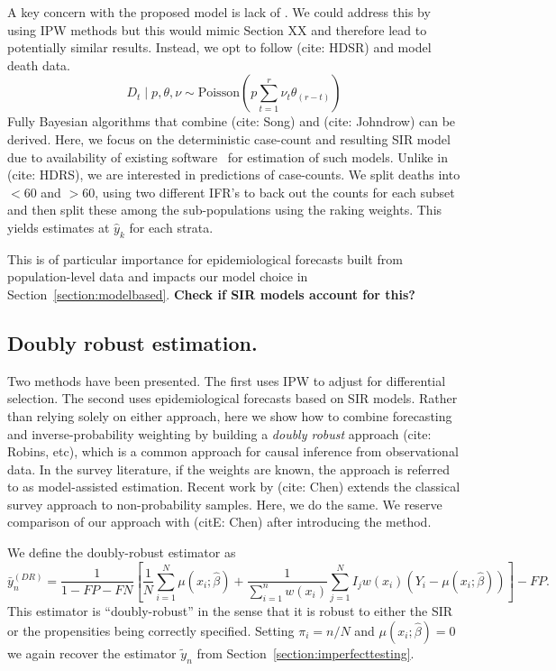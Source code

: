 \documentclass[11pt]{amsart}
\begin{document}
A key concern with the proposed model is lack of . We could address this by using IPW methods but this would mimic Section XX and therefore lead to potentially similar results.  Instead, we opt to follow (cite: HDSR) and model death data.
$$
D_t \mid p, \theta, \nu \sim \text{Poisson} \left( p \sum_{t=1}^r \nu_t \theta_{(r-t)} \right)
$$
Fully Bayesian algorithms that combine (cite: Song) and (cite: Johndrow) can be derived.  Here, we focus on the deterministic case-count and resulting SIR model due to availability of existing software~\cite{Song2020} for estimation of such models. Unlike in (cite: HDRS), we are interested in predictions of case-counts.  We split deaths into $<60$ and $>60$, using two different IFR's to back out the counts for each subset and then split these among the sub-populations using the raking weights.  This yields estimates at $\hat y_k$ for each strata.

This is of particular importance for epidemiological forecasts built from population-level data and impacts our model choice in Section~\ref{section:modelbased}.
{\bf Check if SIR models account for this?}

\subsection{Doubly robust estimation.}
Two methods have been presented.  The first uses IPW to adjust for differential selection.  The second uses epidemiological forecasts based on SIR models.  Rather than relying solely on either approach, here we show how to combine forecasting and inverse-probability weighting by building a \emph{doubly robust} approach (cite: Robins, etc), which is a common approach for causal inference from observational data.  In the survey literature, if the weights are known, the approach is referred to as model-assisted estimation.  Recent work by (cite: Chen) extends the classical survey approach to non-probability samples.  Here, we do the same.  We reserve comparison of our approach with (citE: Chen) after introducing the method.

We define the doubly-robust estimator as
$$
\bar y_{n}^{(DR)} = \frac{1}{1 - FP - FN} \left[ \frac{1}{N} \sum_{i=1}^N \mu (x_i; \hat \beta) + \frac{1}{\sum_{i=1}^n w(x_i)} \sum_{j=1}^N I_j w(x_i) (Y_i - \mu(x_i; \hat \beta)) \right] - FP.
$$
This estimator is ``doubly-robust'' in the sense that it is robust to either the SIR or the propensities being correctly specified.  Setting $\pi_i = n/N$ and $\mu(x_i; \hat \beta) = 0$ we again recover the estimator $\tilde y_n$ from Section~\ref{section:imperfecttesting}.
\end{document}
